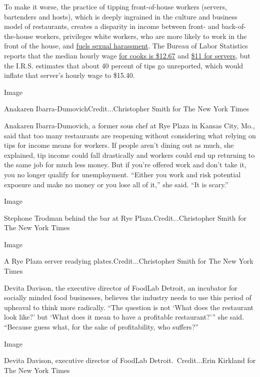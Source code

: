 To make it worse, the practice of tipping front-of-house workers
(servers, bartenders and hosts), which is deeply ingrained in the
culture and business model of restaurants, creates a disparity in income
between front- and back-of-the-house workers, privileges white workers,
who are more likely to work in the front of the house, and
\href{https://www.nytimes3xbfgragh.onion/interactive/2018/03/11/business/tipping-sexual-harassment.html}{fuels
sexual harassment}. The Bureau of Labor Statistics reports that the
median hourly wage
\href{https://www.bls.gov/ooh/food-preparation-and-serving/cooks.htm}{for
cooks is \$12.67} and
\href{https://www.bls.gov/oes/current/oes353031.htm}{\$11 for servers},
but the I.R.S. estimates that about 40 percent of tips go unreported,
which would inflate that server's hourly wage to \$15.40.

Image

Anakaren Ibarra-DumovichCredit...Christopher Smith for The New York
Times

Anakaren Ibarra-Dumovich, a former sous chef at Rye Plaza in Kansas
City, Mo., said that too many restaurants are reopening without
considering what relying on tips for income means for workers. If people
aren't dining out as much, she explained, tip income could fall
drastically and workers could end up returning to the same job for much
less money. But if you're offered work and don't take it, you no longer
qualify for unemployment. ``Either you work and risk potential exposure
and make no money or you lose all of it,'' she said. ``It is scary.''

Image

Stephone Trodman behind the bar at Rye Plaza.Credit...Christopher Smith
for The New York Times

Image

A Rye Plaza server readying plates.Credit...Christopher Smith for The
New York Times

Devita Davison, the executive director of FoodLab Detroit, an incubator
for socially minded food businesses, believes the industry needs to use
this period of upheaval to think more radically. ``The question is not
`What does the restaurant look like?' but `What does it mean to have a
profitable restaurant?''' she said. ``Because guess what, for the sake
of profitability, who suffers?''

Image

Devita Davison, executive director of FoodLab Detroit.~Credit...Erin
Kirkland for The New York Times

